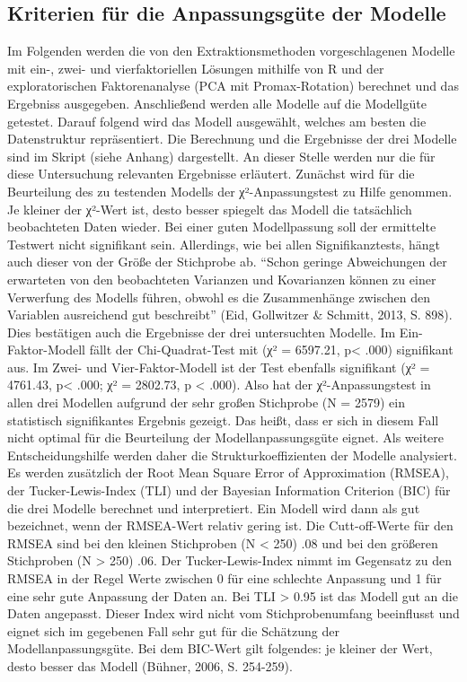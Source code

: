\documentclass[12pt,a4paper]{article}
\begin{document}
\subsection{Kriterien für die Anpassungsgüte der Modelle}
Im Folgenden werden die von den Extraktionsmethoden vorgeschlagenen Modelle mit ein-, zwei- und vierfaktoriellen Lösungen mithilfe von R und der exploratorischen Faktorenanalyse (PCA mit Promax-Rotation) berechnet und das Ergebniss ausgegeben. Anschließend werden alle Modelle auf die Modellgüte getestet. Darauf folgend wird das Modell ausgewählt, welches am besten die Datenstruktur repräsentiert.
	Die Berechnung und die Ergebnisse der drei Modelle sind im Skript (siehe Anhang) dargestellt. An dieser Stelle werden nur die für diese Untersuchung relevanten Ergebnisse erläutert. Zunächst wird für die Beurteilung des zu testenden Modells der χ²-Anpassungstest zu Hilfe genommen. Je kleiner der χ²-Wert ist, desto besser spiegelt das Modell die tatsächlich beobachteten Daten wieder. Bei einer guten Modellpassung soll der ermittelte Testwert nicht signifikant sein. Allerdings, wie bei allen Signifikanztests, hängt auch dieser von der Größe der Stichprobe ab. "`Schon geringe Abweichungen der erwarteten von den beobachteten Varianzen und Kovarianzen können zu einer Verwerfung des Modells führen, obwohl es die Zusammenhänge zwischen den Variablen ausreichend gut beschreibt"' (Eid, Gollwitzer \& Schmitt, 2013, S. 898). Dies bestätigen auch die Ergebnisse der drei untersuchten Modelle. Im Ein-Faktor-Modell fällt der Chi-Quadrat-Test mit (χ² = 6597.21, p< .000) signifikant aus. Im Zwei- und Vier-Faktor-Modell ist der Test ebenfalls signifikant (χ²  = 4761.43, p< .000;  χ² = 2802.73, p < .000). 
	Also hat der χ²-Anpassungstest in allen drei Modellen aufgrund der sehr großen Stichprobe (N = 2579) ein statistisch signifikantes Ergebnis gezeigt. Das heißt, dass er sich in diesem Fall nicht optimal für die Beurteilung der Modellanpassungsgüte eignet. 
	 Als weitere Entscheidungshilfe werden daher die Strukturkoeffizienten der Modelle analysiert. Es werden zusätzlich der Root Mean Square Error of Approximation (RMSEA), der Tucker-Lewis-Index (TLI) und der Bayesian Information Criterion (BIC) für die drei Modelle berechnet und interpretiert. Ein Modell wird dann als gut bezeichnet, wenn der RMSEA-Wert relativ gering ist. Die Cutt-off-Werte für den RMSEA sind bei den kleinen Stichproben (N < 250) 
.08 und bei den größeren Stichproben (N > 250) .06. Der Tucker-Lewis-Index nimmt im Gegensatz zu den RMSEA in der Regel Werte zwischen 0 für eine schlechte Anpassung und 1 für eine sehr gute Anpassung der Daten an. Bei TLI > 0.95 ist das Modell gut an die Daten angepasst. Dieser Index wird nicht vom Stichprobenumfang beeinflusst und eignet sich im gegebenen Fall sehr gut für die Schätzung der Modellanpassungsgüte. Bei dem BIC-Wert gilt folgendes: je kleiner der Wert, desto besser das Modell (Bühner, 2006, S. 254-259).
\end{document}
